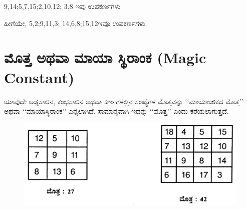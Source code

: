 9,14;5,7,15;2,10,12; 3,8 ಇವು ಉಪಕರ್ಣಗಳು

ಹೀಗೆಯೇ, 5,2;9,11,3; 14,6,8;15,12ಇವೂ ಉಪಕರ್ಣಗಳು.

\section{ಮೊತ್ತ ಅಥವಾ ಮಾಯಾ ಸ್ಥಿರಾಂಕ (Magic Constant)}

ಯಾವುದೇ ಅಡ್ಡಸಾಲಿನ, ಕಂಭಸಾಲಿನ ಅಥವಾ ಕರ್ಣಗಳಲ್ಲಿನ ಸಂಖ್ಯೆಗಳ ಮೊತ್ತವನ್ನು ‘‘ಮಾಯಾಚೌಕದ ಮೊತ್ತ’’ ಅಥವಾ ‘‘ಮಾಯಾಸ್ಥಿರಾಂಕ’’ ಎನ್ನಲಾಗಿದೆ. ಸಾಮಾನ್ಯವಾಗಿ ಇದನ್ನು ‘‘ಮೊತ್ತ’’ ಎಂದು ಕರೆಯಲಾಗುತ್ತದೆ.
\begin{figure}[H]
\includegraphics{src/figures/chap2/fig2.5.jpg}
\end{figure}
